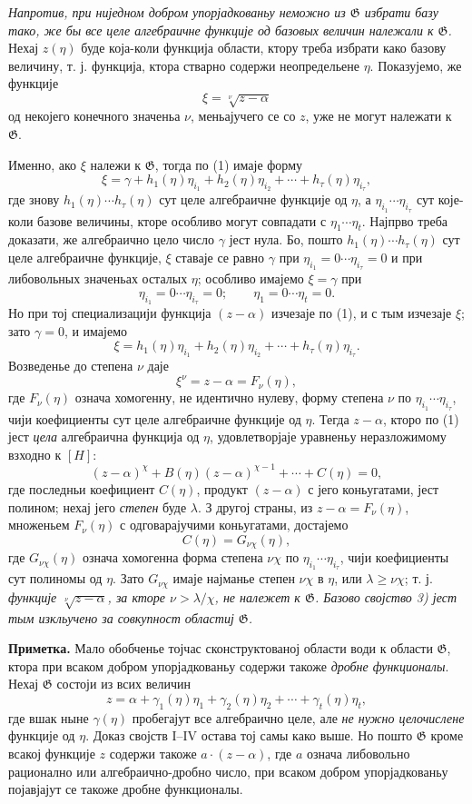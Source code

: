 ﻿\documentclass[11pt]{article}
\begin{document}
{\itshape Напротив, при ниједном добром упорјадкованьу неможно из $\mathfrak G$
избрати базу тако, же бы все целе алгебраичне функције од базовых величин
належали к $\mathfrak G$.} Нехај $z(\eta)$ буде која-коли функција области,
ктору треба избрати како базову величину, т. ј. функција, ктора стварно содержи
неопредельене $\eta$. Показујемо, же функције
\[
 \xi=\sqrt[\nu]{z-\alpha}
\]
од некојего конечного значеньа $\nu$, меньајучего се со $z$, уже не могут
належати к $\mathfrak G$.

Именно, ако $\xi$ належи к $\mathfrak G$, тогда по (1) имаје форму
\[
 \xi=\gamma+h_1(\eta)\eta_{i_1}+h_2(\eta)\eta_{i_2}
      +\cdots+h_\tau(\eta)\eta_{i_\tau},
\]
где знову $h_1(\eta)\cdots h_\tau(\eta)$ сут целе алгебраичне функције од
$\eta$, а $\eta_{i_1}\cdots\eta_{i_\tau}$ сут које-коли базове величины, кторе
особливо могут совпадати с $\eta_1\cdots\eta_t$. Најпрво треба доказати, же
алгебраично цело число $\gamma$ јест нула. Бо, пошто
$h_1(\eta)\cdots h_\tau(\eta)$ сут целе алгебраичне функције, $\xi$ ставаје се
равно $\gamma$ при $\eta_{i_1}=0\cdots\eta_{i_\tau}=0$ и при либовольных
значеньах осталых $\eta$; особливо имајемо $\xi=\gamma$ при
\[
 \eta_{i_1}=0\cdots \eta_{i_\tau}=0; \qquad
 \eta_1=0\cdots \eta_t=0.
\]
Но при тој специализацији функција $(z-\alpha)$ изчезаје по (1), и с тым
изчезаје $\xi$; зато $\gamma=0$, и имајемо
\[
 \xi=h_1(\eta)\eta_{i_1}+h_2(\eta)\eta_{i_2}
      +\cdots+h_\tau(\eta)\eta_{i_\tau}.
\]
Возведенье до степена $\nu$ даје
\[
 \xi^\nu=z-\alpha=F_\nu(\eta),
\]
где $F_\nu(\eta)$ означа хомогенну, не идентично нулеву, форму степена $\nu$ по
$\eta_{i_1}\cdots\eta_{i_\tau}$, чији коефициенты сут целе алгебраичне функције
од $\eta$. Тегда $z-\alpha$, кторо по (1) јест {\itshape цела} алгебраична
функција од $\eta$, удовлетворјаје уравненьу неразложимому взходно к $[H]$:
\[
 (z-\alpha)^\chi+B(\eta)(z-\alpha)^{\chi-1}+\cdots+C(\eta)=0,
\]
где последньи коефициент $C(\eta)$, продукт $(z-\alpha)$ с јего коньугатами,
јест полином; нехај јего {\itshape степен} буде $\lambda$. З другој страны, из
$z-\alpha=F_\nu(\eta)$, множеньем $F_\nu(\eta)$ с одговарајучими коньугатами,
достајемо
\[
 C(\eta)=G_{\nu\chi}(\eta),
\]
где $G_{\nu\chi}(\eta)$ означа хомогенна форма степена $\nu\chi$ по
$\eta_{i_1}\cdots\eta_{i_\tau}$, чији коефициенты сут полиномы од $\eta$.
Зато $G_{\nu\chi}$ имаје најманье степен $\nu\chi$ в $\eta$, или
$\lambda\geq\nu\chi$; т. ј. {\itshape функције
$\sqrt[\nu]{z-\alpha}$, за кторе $\nu>\lambda/\chi$, не належет к
$\mathfrak G$. Базово својство 3) јест тым изкльучено за совкупност областиј
$\mathfrak G$.}

\textbf{Приметка.} Мало обобченье тојчас сконструктованој области води к
области $\mathfrak G$, ктора при всаком добром упорјадкованьу содержи такоже
{\itshape дробне функционалы}. Нехај $\mathfrak G$ состоји из всих величин
\[
 z=\alpha+\gamma_1(\eta)\eta_1+\gamma_2(\eta)\eta_2
      +\cdots+\gamma_t(\eta)\eta_t,
\]
где вшак ныне $\gamma(\eta)$ пробегајут все алгебраично целе, але
{\itshape не нужно целочислене} функције од $\eta$. Доказ својств I--IV остава
тој самы како выше. Но пошто $\mathfrak G$ кроме всакој функције $z$ содержи
такоже $a\cdot(z-\alpha)$, где $a$ означа либовольно рационално или
алгебраично-дробно число, при всаком добром упорјадкованьу појавјајут се такоже
дробне функционалы.
\end{document}
